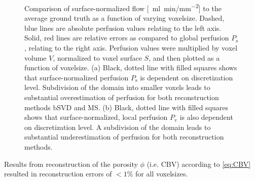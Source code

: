 \documentclass[final,5p,times,twocolumn]{elsarticle}
\begin{document}
\begin{figure}[]
\begin{tabular}{c c}
    	\end{tabular}
    	\caption{Comparison of surface-normalized flow [\SI{}{\milli\litre\per\minute/\milli\meter\squared}] to the average ground truth as a function of varying voxelsize. Dashed, blue lines are absolute perfusion values relating to the left axis. Solid, red lines are relative errors as compared to global perfusion $P_{\mathrm{s}}$, relating to the right axis. Perfusion values were multiplied by voxel volume $V$, normalized to voxel surface $S$, and then plotted as a function of voxelsize. (a) Black, dotted line with filled squares shows that surface-normalized perfusion $P_{\mathrm{s}}$ is dependent on discretization level. Subdivision of the domain into smaller voxels leads to substantial overestimation of perfusion for both reconstruction methods bSVD and MS. (b) Black, dotted line with filled squares shows that surface-normalized, local perfusion $P_{\mathrm{v}}$ is also dependent on discretization level. A subdivision of the domain leads to substantial underestimation of perfusion for both reconstruction methods.}
            \label{fig:surfnormperf}
    \end{figure}
	Results from reconstruction of the porosity $\phi$ (i.e. CBV) according to \eqref{eq:CBV} resulted in reconstruction errors of $<1\%$ for all voxelsizes. 
\end{document}

